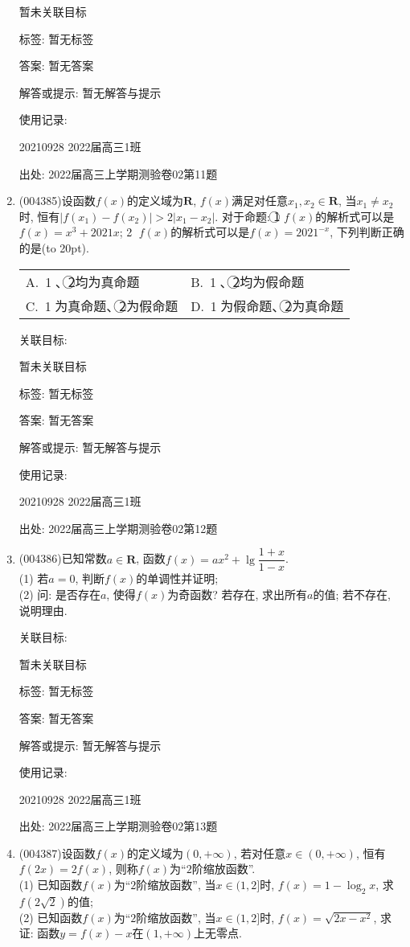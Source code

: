 \documentclass[10pt,a4paper]{article}
\newcommand{\bracket}[1]{(\hbox to #1pt{})}
\newcommand{\twoch}[4]{\par\begin{tabular}{p{.46\textwidth}p{.46\textwidth}}
A.~#1& B.~#2\\
C.~#3& D.~#4
\end{tabular}}
\begin{document}
\begin{enumerate}[1.]
暂未关联目标



标签: 暂无标签

答案: 暂无答案

解答或提示: 暂无解答与提示

使用记录:

20210928	2022届高三1班	


出处: 2022届高三上学期测验卷02第11题
\item { (004385)}设函数$f(x)$的定义域为$\mathbf{R}$, $f(x)$满足对任意$x_1,x_2\in \mathbf{R}$, 当$x_1\ne x_2$时, 恒有$|f(x_1)-f(x_2)|>2|x_1-x_2|$. 对于命题: \textcircled{1} $f(x)$的解析式可以是$f(x)=x^3+2021x$; \textcircled{2} $f(x)$的解析式可以是$f(x)=2021^{-x}$, 下列判断正确的是\bracket{20}.
\twoch{\textcircled{1}、\textcircled{2}均为真命题}{\textcircled{1}、\textcircled{2}均为假命题}{\textcircled{1}为真命题、\textcircled{2}为假命题}{\textcircled{1}为假命题、\textcircled{2}为真命题}


关联目标:

暂未关联目标



标签: 暂无标签

答案: 暂无答案

解答或提示: 暂无解答与提示

使用记录:

20210928	2022届高三1班	


出处: 2022届高三上学期测验卷02第12题
\item { (004386)}已知常数$a\in \mathbf{R}$, 函数$f(x)=ax^2+\lg \dfrac{1+x}{1-x}$.\\
(1) 若$a=0$, 判断$f(x)$的单调性并证明;\\
(2) 问: 是否存在$a$, 使得$f(x)$为奇函数? 若存在, 求出所有$a$的值; 若不存在, 说明理由.


关联目标:

暂未关联目标



标签: 暂无标签

答案: 暂无答案

解答或提示: 暂无解答与提示

使用记录:

20210928	2022届高三1班		


出处: 2022届高三上学期测验卷02第13题
\item { (004387)}设函数$f(x)$的定义域为$(0,+\infty)$, 若对任意$x\in (0,+\infty)$, 恒有$f(2x)=2f(x)$, 则称$f(x)$为``$2$阶缩放函数''.\\
(1) 已知函数$f(x)$为``$2$阶缩放函数'', 当$x\in (1,2]$时, $f(x)=1-\log_2 x$, 求$f(2\sqrt{2})$的值;\\
(2) 已知函数$f(x)$为``$2$阶缩放函数'', 当$x\in (1,2]$时, $f(x)=\sqrt{2x-x^2}$, 求证: 函数$y=f(x)-x$在$(1,+\infty)$上无零点.



\end{enumerate}
\end{document}
